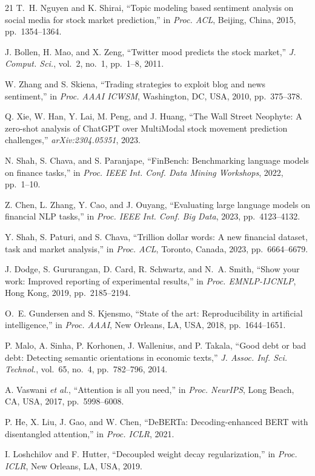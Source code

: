 \documentclass[conference]{IEEEtran}
\begin{document}
\begin{thebibliography}{21}
T.~H. Nguyen and K. Shirai,
``Topic modeling based sentiment analysis on social media for stock market
prediction,''
in \textit{Proc. ACL}, Beijing, China, 2015, pp.~1354--1364.

J. Bollen, H. Mao, and X. Zeng,
``Twitter mood predicts the stock market,''
\textit{J. Comput. Sci.}, vol.~2, no.~1, pp.~1--8, 2011.

W. Zhang and S. Skiena,
``Trading strategies to exploit blog and news sentiment,''
in \textit{Proc. AAAI ICWSM}, Washington, DC, USA, 2010, pp.~375--378.

Q. Xie, W. Han, Y. Lai, M. Peng, and J. Huang,
``The Wall Street Neophyte: A zero-shot analysis of ChatGPT over MultiModal
stock movement prediction challenges,''
\textit{arXiv:2304.05351}, 2023.

N. Shah, S. Chava, and S. Paranjape,
``FinBench: Benchmarking language models on finance tasks,''
in \textit{Proc. IEEE Int. Conf. Data Mining Workshops}, 2022, pp.~1--10.

Z. Chen, L. Zhang, Y. Cao, and J. Ouyang,
``Evaluating large language models on financial NLP tasks,''
in \textit{Proc. IEEE Int. Conf. Big Data}, 2023, pp.~4123--4132.

Y. Shah, S. Paturi, and S. Chava,
``Trillion dollar words: A new financial dataset, task and market analysis,''
in \textit{Proc. ACL}, Toronto, Canada, 2023, pp.~6664--6679.

J. Dodge, S. Gururangan, D. Card, R. Schwartz, and N.~A. Smith,
``Show your work: Improved reporting of experimental results,''
in \textit{Proc. EMNLP-IJCNLP}, Hong Kong, 2019, pp.~2185--2194.

O.~E. Gundersen and S. Kjensmo,
``State of the art: Reproducibility in artificial intelligence,''
in \textit{Proc. AAAI}, New Orleans, LA, USA, 2018, pp.~1644--1651.

P. Malo, A. Sinha, P. Korhonen, J. Wallenius, and P. Takala,
``Good debt or bad debt: Detecting semantic orientations in economic texts,''
\textit{J. Assoc. Inf. Sci. Technol.}, vol.~65, no.~4, pp.~782--796, 2014.

A. Vaswani \textit{et al.},
``Attention is all you need,''
in \textit{Proc. NeurIPS}, Long Beach, CA, USA, 2017, pp.~5998--6008.

P. He, X. Liu, J. Gao, and W. Chen,
``DeBERTa: Decoding-enhanced BERT with disentangled attention,''
in \textit{Proc. ICLR}, 2021.

I. Loshchilov and F. Hutter,
``Decoupled weight decay regularization,''
in \textit{Proc. ICLR}, New Orleans, LA, USA, 2019.

\end{thebibliography}
\end{document}

